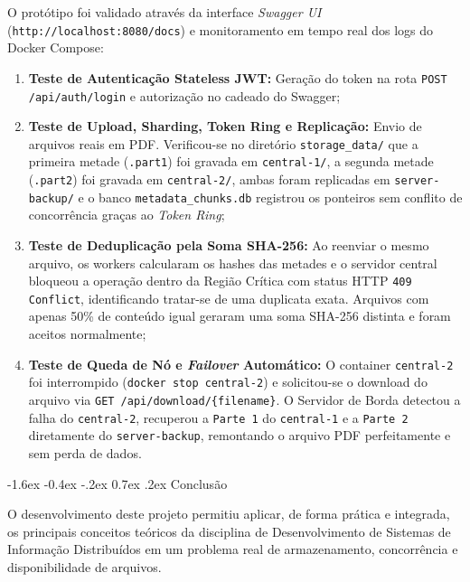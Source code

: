 \documentclass[12pt]{article}
\makeatletter
\renewcommand\section{\@startsection {section}{1}{\z@}%
    {-1.6ex \@plus -0.4ex \@minus -.2ex}%
    {0.7ex \@plus.2ex}%
    {\normalfont\large\bfseries}}
\makeatother
\begin{document}
O protótipo foi validado através da interface \textit{Swagger UI} (\texttt{http://localhost:8080/docs}) e monitoramento em tempo real dos logs do Docker Compose:
\begin{enumerate}
    \item \textbf{Teste de Autenticação Stateless JWT:} Geração do token na rota \texttt{POST /api/auth/login} e autorização no cadeado do Swagger;
    \item \textbf{Teste de Upload, Sharding, Token Ring e Replicação:} Envio de arquivos reais em PDF. Verificou-se no diretório \texttt{storage\_data/} que a primeira metade (\texttt{.part1}) foi gravada em \texttt{central-1/}, a segunda metade (\texttt{.part2}) foi gravada em \texttt{central-2/}, ambas foram replicadas em \texttt{server-backup/} e o banco \texttt{metadata\_chunks.db} registrou os ponteiros sem conflito de concorrência graças ao \textit{Token Ring};
    \item \textbf{Teste de Deduplicação pela Soma SHA-256:} Ao reenviar o mesmo arquivo, os workers calcularam os hashes das metades e o servidor central bloqueou a operação dentro da Região Crítica com status HTTP \texttt{409 Conflict}, identificando tratar-se de uma duplicata exata. Arquivos com apenas 50\% de conteúdo igual geraram uma soma SHA-256 distinta e foram aceitos normalmente;
    \item \textbf{Teste de Queda de Nó e \textit{Failover} Automático:} O container \texttt{central-2} foi interrompido (\texttt{docker stop central-2}) e solicitou-se o download do arquivo via \texttt{GET /api/download/\{filename\}}. O Servidor de Borda detectou a falha do \texttt{central-2}, recuperou a \texttt{Parte 1} do \texttt{central-1} e a \texttt{Parte 2} diretamente do \texttt{server-backup}, remontando o arquivo PDF perfeitamente e sem perda de dados.
\end{enumerate}

\section{Conclusão}

O desenvolvimento deste projeto permitiu aplicar, de forma prática e integrada, os principais conceitos teóricos da disciplina de Desenvolvimento de Sistemas de Informação Distribuídos em um problema real de armazenamento, concorrência e disponibilidade de arquivos.
\end{document}
